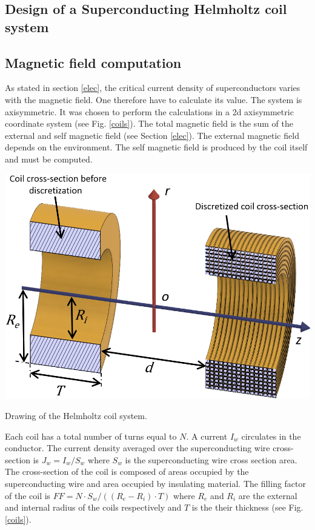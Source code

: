 \documentclass{ws-jmrr}
\begin{document}
\begin{multicols}{2}
\section{Design of a Superconducting Helmholtz coil system}
\subsection{Magnetic field computation}
As stated in section \ref{elec}, the critical current density of superconductors varies with the magnetic field. One therefore have to calculate its value. The system is axisymmetric. It was chosen to perform the calculations in a 2d axisymmetric coordinate system (see Fig. \ref{coils}). The total magnetic field is the sum of the external and self magnetic field (see Section \ref{elec}). The external magnetic field depends on the environment. The self magnetic field is produced by the coil itself and must be computed.\par
\begin{figurehere}
	\begin{center}
	\includegraphics[width=\linewidth]{coil_system.png}
	\caption{Drawing of the Helmholtz coil system.}
	\label{coils}
	\end{center}
\end{figurehere}
Each coil has a total number of turns equal to $N$. A current $I_w$ circulates in the conductor. The current density averaged over the superconducting wire cross-section is $J_w=I_w/S_w$ where $S_w$ is the superconducting wire cross section area. The cross-section of the coil is composed of areas occupied by the superconducting wire and area occupied by insulating material. The filling factor of the coil is $FF=N\cdot S_w/((R_e-R_i)\cdot T)$ where $R_e$ and $R_i$ are the external and internal radius of the coils respectively and $T$ is the their thickness (see Fig. \ref{coils}).\par

\end{multicols}
\end{document}
